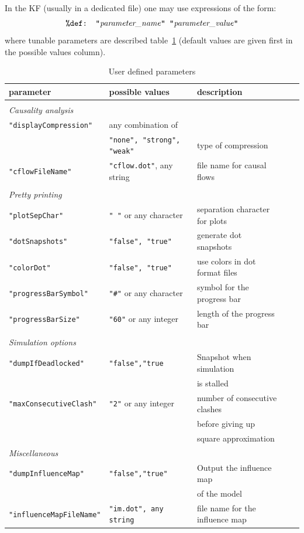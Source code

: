 \documentclass[11pt]{book}
\def\ttt#1{\texttt{#1}}
\begin{document}
In the KF (usually in a dedicated file) one may use expressions of the form:
\[
\hbox{\ttt{\%def: "}\textit{parameter\_name}\ttt{" "}\textit{parameter\_value}\ttt{"}}
\]
where tunable parameters are described table~\ref{tab:parameters} (default values are given first in the possible values column).
\begin{table}[ht]
\caption{User defined parameters}
\begin{tabular}{l|l|lll}
parameter & possible values & description \\
\hline &\\
\textit{Causality analysis}&\\
\ttt{"displayCompression"} & any combination of \\
&  \ttt{"none", "strong", "weak"} & \small type of compression \\
\ttt{"cflowFileName"} & \ttt{"cflow.dot"}, any string & \small file name for causal flows\\ & \\
\textit{Pretty printing}&\\
\ttt{"plotSepChar"} & \ttt{" "} or any character & \small separation character for plots\\
\ttt{"dotSnapshots"} & \ttt{"false", "true"} & \small generate dot snapshots\\
\ttt{"colorDot"} &  \ttt{"false", "true"} & \small use colors in dot format files\\
\ttt{"progressBarSymbol"} & \ttt{"\#"} or any character & \small symbol for the progress bar\\
\ttt{"progressBarSize"} & \ttt{"60"} or any integer & \small length of the progress bar\\ &&\\
\textit{Simulation options} &\\
\ttt{"dumpIfDeadlocked"} & \ttt{"false","true} & \small Snapshot when simulation \\&&\small is stalled\\
\ttt{"maxConsecutiveClash"} & \ttt{"2"} or any integer & \small number of consecutive clashes \\ && \small before giving up \\ && \small square approximation\\
\textit{Miscellaneous} &\\
\ttt{"dumpInfluenceMap"} & \ttt{"false","true"} & \small Output the influence map \\ &&\small of the model\\
\ttt{"influenceMapFileName"} & \ttt{"im.dot", any string} & \small file name for the influence map\\

\end{tabular}
\label{tab:parameters}
\end{table}
\end{document}
